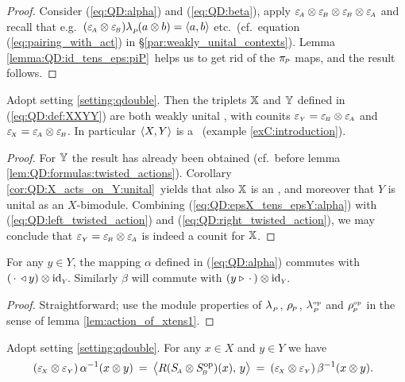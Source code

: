 \begin{proof}
Consider (\ref{eq:QD:alpha}) and (\ref{eq:QD:beta}),
apply $\varepsilon_{\scriptscriptstyle \! A} \otimes \varepsilon_{\scriptscriptstyle \! B} \otimes \varepsilon_{\scriptscriptstyle \! B} \otimes \varepsilon_{\scriptscriptstyle \! A}$ and recall that e.g.\
$(\varepsilon_{\scriptscriptstyle \! A} \otimes \varepsilon_{\scriptscriptstyle \! B})\lambda_{_P\!}(a\otimes b) = \langle a,b \rangle$ etc.\
(cf.\ equation (\ref{eq:pairing_with_act}) in \S \ref{par:weakly_unital_contexts}).
Lemma \ref{lemma:QD:id_tens_eps:piP}\ helps us to get rid of the $\pi_{\scriptscriptstyle \! P}$ maps,
and the result follows.
\end{proof}



\begin{prop} \label{prop:QD:dpa}
Adopt setting \ref{setting:qdouble}\@.
Then the triplets\/ $\mathbb{X}$ and\/ $\mathbb{Y}$ defined in (\ref{eq:QD:def:XXYY})
are both weakly unital \contexts, with counits\/ $\varepsilon_{\scriptscriptstyle Y} = \varepsilon_{\scriptscriptstyle \! B} \otimes \varepsilon_{\scriptscriptstyle \! A}$
and\/ $\varepsilon_{\scriptscriptstyle \! X} = \varepsilon_{\scriptscriptstyle \! A} \otimes \varepsilon_{\scriptscriptstyle \! B}$.
In particular\/ $\langle X,Y \rangle$ is a \dpa\ (example \ref{exC:introduction}).
\end{prop}
\begin{proof}
For $\mathbb{Y}$ the result has already been obtained
(cf.\ before lemma \ref{lem:QD:formulas:twisted_actions}).
Corollary \ref{cor:QD:X_acts_on_Y:unital}\ yields that also $\mathbb{X}$ is an \context,
and moreover that $Y$ is unital as an $X$-bimodule.
Combining (\ref{eq:QD:epsX_tens_epsY:alpha}) with (\ref{eq:QD:left_twisted_action})
and (\ref{eq:QD:right_twisted_action}), we may conclude that
$\varepsilon_{\scriptscriptstyle Y} = \varepsilon_{\scriptscriptstyle \! B} \otimes \varepsilon_{\scriptscriptstyle \! A}$ is indeed a counit for $\mathbb{X}$.
\end{proof}


\begin{lemma}  \label{lem:QD:module_prop_alphabeta}
For any\/ $y\in Y$, the mapping\/ $\alpha$ defined in (\ref{eq:QD:alpha}) commutes with
$( \,\cdot \,\triangleleft y) \otimes \mbox{\rm id}_{\scriptscriptstyle Y\!}$.
Similarly\/ $\beta$ will commute with $(y \triangleright \,\cdot \,) \otimes \mbox{\rm id}_{\scriptscriptstyle Y\!}$.
\end{lemma}

\begin{proof}
Straightforward; use the module properties of $\lambda_{_P\!}\,$, $\rho_{_{\!P}}$, $\lambda^{\scriptscriptstyle \rm op}_{_P\!}$ and $\rho^{\scriptscriptstyle \rm op}_{_{\!P}}$
in the sense of lemma \ref{lem:action_of_xtens1}\@.
\end{proof}



\begin{lemma}  \label{lem:QD:antipode}
Adopt setting \ref{setting:qdouble}\@. For any\/ $x \in X$ and\/ $y \in Y$ we have
\begin{equation}\label{eq:QD:epsX_tens_epsY:alpha_inverse}
 (\epsX \tens \epsY) \, \alpha^{-1} (x \tens y)
      \:=\: \pairM{R(\SA \tens \SB\op)(x)}{y}
      \:=\: (\epsX \tens \epsY) \, \beta^{-1} (x \tens y).
\hspace{0.5em}
\end{equation}
\end{lemma}

